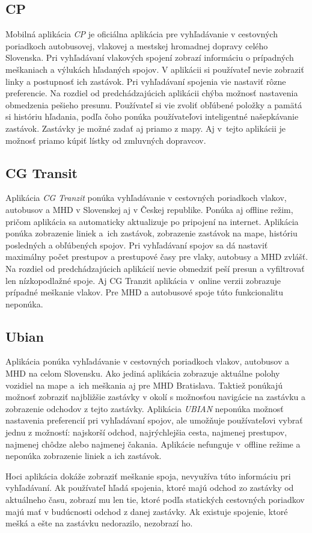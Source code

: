 \subsection{CP}
Mobilná aplikácia \textit{CP} je oficiálna aplikácia pre vyhľadávanie v cestovných poriadkoch autobusovej, vlakovej a mestskej hromadnej dopravy celého Slovenska.  Pri vyhľadávaní vlakových spojení zobrazí informáciu o prípadných meškaniach a výlukách hľadaných spojov. V aplikácii si používateľ nevie zobraziť linky a postupnosť ich zastávok. Pri vyhľadávaní spojenia vie nastaviť rôzne preferencie. Na rozdiel od predchádzajúcich aplikácii chýba možnosť nastavenia obmedzenia pešieho presunu. Používateľ si vie zvoliť obľúbené položky a pamätá si históriu hľadania, podľa čoho ponúka používateľovi inteligentné našepkávanie zastávok. Zastávky je možné zadať aj priamo z mapy. Aj v~tejto aplikácii je možnosť priamo kúpiť lístky od zmluvných dopravcov.

\subsection{CG Transit}
Aplikácia \textit{CG Tranzit} ponúka vyhľadávanie v cestovných poriadkoch vlakov, autobusov a MHD v Slovenskej aj v Českej republike. Ponúka aj offline režim, pričom aplikácia sa automaticky aktualizuje po pripojení na internet. Aplikácia ponúka zobrazenie liniek a~ich zastávok, zobrazenie zastávok na mape, históriu posledných a obľúbených spojov. Pri vyhľadávaní spojov sa dá nastaviť maximálny počet prestupov a prestupové časy pre vlaky, autobusy a MHD zvlášť. Na rozdiel od predchádzajúcich aplikácií nevie obmedziť peší presun a vyfiltrovať len nízkopodlažné spoje. Aj CG Tranzit aplikácia v~online verzii zobrazuje prípadné meškanie vlakov. Pre MHD a autobusové spoje túto funkcionalitu neponúka.

\subsection{Ubian}
Aplikácia ponúka vyhľadávanie v cestovných poriadkoch vlakov, autobusov a MHD na celom Slovensku. Ako jediná aplikácia zobrazuje aktuálne polohy vozidiel na mape a~ich meškania aj pre MHD Bratislava. Taktiež ponúkajú možnosť zobraziť najbližšie zastávky v okolí s možnosťou navigácie na zastávku a zobrazenie odchodov z tejto zastávky. Aplikácia \textit{UBIAN} neponúka možnosť nastavenia preferencií pri vyhľadávaní spojov, ale umožňuje používateľovi vybrať jednu z možností: najskorší odchod, najrýchlejšia cesta, najmenej prestupov, najmenej chôdze alebo najmenej čakania. Aplikácie nefunguje v~offline režime a neponúka zobrazenie liniek a ich zastávok.

Hoci aplikácia dokáže zobraziť meškanie spoja, nevyužíva túto informáciu pri vyhľadávaní. Ak používateľ hľadá spojenia, ktoré majú odchod zo zastávky od aktuálneho času, zobrazí mu len tie, ktoré podľa statických cestovných poriadkov majú mať v budúcnosti odchod z danej zastávky. Ak existuje spojenie, ktoré mešká a ešte na zastávku nedorazilo, nezobrazí ho.



